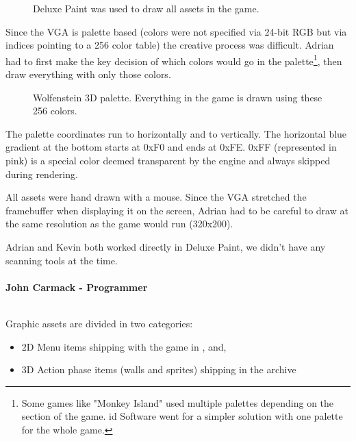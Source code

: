 \documentclass[book.tex]{subfiles}
\begin{document}
\begin{figure}[H]
  \centering
 \caption{Deluxe Paint was used to draw all assets in the game.}
\end{figure}


\par
Since the VGA is palette based (colors were not specified via 24-bit RGB but via indices pointing to a 256 color table) the creative process was difficult. Adrian had to first make the key decision of which colors would go in the palette\footnote{Some games like "Monkey Island" used multiple palettes depending on the section of the game. id Software went for a simpler solution with one palette for the whole game.}, then draw everything with only those colors.\\
\begin{figure}[H]
  \centering
{}
 \caption{Wolfenstein 3D palette. Everything in the game is drawn using these 256 colors.}
\end{figure}
The palette coordinates run  to  horizontally and  to  vertically. The horizontal blue gradient at the bottom starts at 0xF0 and ends at 0xFE. 0xFF (represented in pink) is a special color deemed transparent by the engine and always skipped during rendering.\\
\par

All assets were hand drawn with a mouse. Since the VGA stretched the framebuffer when displaying it on the screen, Adrian had to be careful to draw at the same resolution as the game would run (320x200).\\
\par
\begin{fancyquotes}
Adrian and Kevin both worked directly in Deluxe Paint, we didn't have any scanning tools at the time.\\
\\
\textbf{John Carmack - Programmer}
\end{fancyquotes}
\\
Graphic assets are divided in two categories:
\begin{itemize}
\item 2D Menu items shipping with the game in ,  and, 
\item 3D Action phase items (walls and sprites) shipping in the  archive
\end{itemize}
\end{document}
